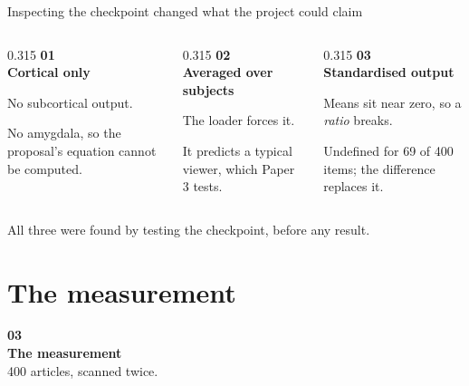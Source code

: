 \documentclass[aspectratio=169,11pt]{beamer}
\newcommand{\display}{\raggedright\hyphenpenalty=10000\exhyphenpenalty=10000\relax}
\newcommand{\act}[3]{%
  \begin{frame}[plain]
    \vfill
    \hspace{0.10\textwidth}%
    \begin{minipage}{0.8\textwidth}
      \display
      {\color{midblue}\fontsize{38}{38}\selectfont\bfseries #1}\\[0.5em]
      {\color{navy}\fontsize{25}{29}\selectfont\bfseries #2}\\[0.7em]
      {\color{slate}\large #3}
    \end{minipage}
    \vfill
  \end{frame}%
}
\begin{document}
\begin{frame}{Inspecting the checkpoint changed what the project could claim}
\vspace{0.5em}
\begin{columns}[T]
\begin{column}{0.315\textwidth}
{\color{midblue}\bfseries\large 01}\\[0.3em]
\textbf{Cortical only}\\[0.4em]
{\small No subcortical output.

\vspace{0.5em}
\alert{No amygdala}, so the proposal's equation cannot be computed.}
\end{column}
\begin{column}{0.315\textwidth}
{\color{midblue}\bfseries\large 02}\\[0.3em]
\textbf{Averaged over subjects}\\[0.4em]
{\small The loader forces it.

\vspace{0.5em}
It predicts a typical viewer, which Paper 3 tests.}
\end{column}
\begin{column}{0.315\textwidth}
{\color{midblue}\bfseries\large 03}\\[0.3em]
\textbf{Standardised output}\\[0.4em]
{\small Means sit near zero, so a \emph{ratio} breaks.

\vspace{0.5em}
Undefined for 69 of 400 items; the difference replaces it.}
\end{column}
\end{columns}

\vspace{1.0em}
{\color{slate} All three were found by testing the checkpoint, before any result.}
\end{frame}

\section{The measurement}
\act{03}{The measurement}{400 articles, scanned twice.}
\end{document}
